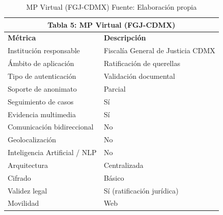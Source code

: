 \begin{table}[htbp]
\centering
\small
\begin{tabular}{|l|l|}
\hline \multicolumn{2}{|c|}{\textbf{Tabla 5: MP Virtual (FGJ-CDMX)}} \\
\hline \textbf{Métrica} & \textbf{Descripción} \\
\hline Institución responsable & Fiscalía General de Justicia CDMX \\
\hline Ámbito de aplicación & Ratificación de querellas \\
\hline Tipo de autenticación & Validación documental \\
\hline Soporte de anonimato & Parcial \\
\hline Seguimiento de casos & Sí \\
\hline Evidencia multimedia & Sí \\
\hline Comunicación bidireccional & No \\
\hline Geolocalización & No \\
\hline Inteligencia Artificial / NLP & No \\
\hline Arquitectura & Centralizada \\
\hline Cifrado & Básico \\
\hline Validez legal & Sí (ratificación jurídica) \\
\hline Movilidad & Web \\
\hline \end{tabular}
\caption{MP Virtual (FGJ-CDMX) \label{tab:mpvirtual} \footnotesize Fuente: Elaboración propia \cite{11,12}} 
\end{table}



